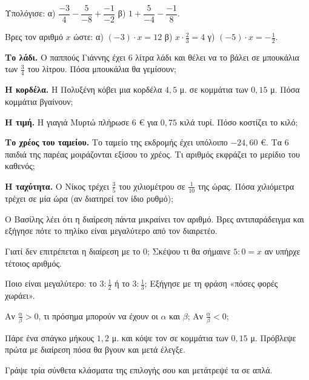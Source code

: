 \ex Υπολόγισε: α) $\dfrac{-3}{4}-\dfrac{5}{-8}+\dfrac{-1}{-2}$ \quad β) $1+\dfrac{5}{-4}-\dfrac{-1}{8}$.

\ex Βρες τον αριθμό $x$ ώστε: α) $(-3)\cdot x=12$ \quad β) $x\cdot\frac{2}{3}=4$ \quad γ) $(-5)\cdot x=-\frac{1}{2}$.


\ex \textbf{Το λάδι.} Ο παππούς Γιάννης έχει $6$ λίτρα λάδι και θέλει να το βάλει σε μπουκάλια των $\frac{3}{4}$ του λίτρου. Πόσα μπουκάλια θα γεμίσουν;

\ex \textbf{Η κορδέλα.} Η Πολυξένη κόβει μια κορδέλα $4{,}5$ μ. σε κομμάτια των $0{,}15$ μ. Πόσα κομμάτια βγαίνουν;

\ex \textbf{Η τιμή.} Η γιαγιά Μυρτώ πλήρωσε $6$ € για $0{,}75$ κιλά τυρί. Πόσο κοστίζει το κιλό;

\ex \textbf{Το χρέος του ταμείου.} Το ταμείο της εκδρομής έχει υπόλοιπο $-24{,}60$ €. Τα $6$ παιδιά της παρέας μοιράζονται εξίσου το χρέος. Τι αριθμός εκφράζει το μερίδιο του καθενός;

\ex \textbf{Η ταχύτητα.} Ο Νίκος τρέχει $\frac{3}{5}$ του χιλιομέτρου σε $\frac{1}{10}$ της ώρας. Πόσα χιλιόμετρα τρέχει σε μία ώρα (αν διατηρεί τον ίδιο ρυθμό);


\ex Ο Βασίλης λέει ότι η διαίρεση πάντα μικραίνει τον αριθμό. Βρες αντιπαράδειγμα και εξήγησε πότε το πηλίκο είναι μεγαλύτερο από τον διαιρετέο.

\ex Γιατί δεν επιτρέπεται η διαίρεση με το $0$; Σκέψου τι θα σήμαινε $5:0=x$ αν υπήρχε τέτοιος αριθμός.

\ex Ποιο είναι μεγαλύτερο: το $3:\frac{1}{2}$ ή το $3:\frac{1}{3}$; Εξήγησε με τη φράση «πόσες φορές χωράει».

\ex Αν $\frac{\alpha}{\beta}>0$, τι πρόσημα μπορούν να έχουν οι $\alpha$ και $\beta$; Αν $\frac{\alpha}{\beta}<0$;


\ex Πάρε ένα σπάγκο μήκους $1{,}2$ μ. και κόψε τον σε κομμάτια των $0{,}15$ μ. Πρόβλεψε πρώτα με διαίρεση πόσα θα βγουν και μετά έλεγξε.

\ex Γράψε τρία σύνθετα κλάσματα της επιλογής σου και μετάτρεψέ τα σε απλά.
